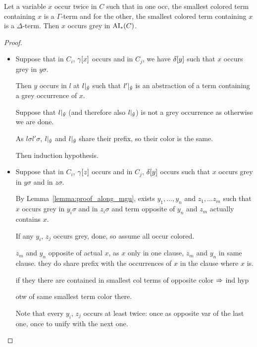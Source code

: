 \documentclass[,%
	paper=a4,%
	DIV11, %
	twoside=false,%
	liststotoc,
	bibtotoc,
	draft=false,%
	numbers=noendperiod
]{scrartcl}
\begin{document}
\begin{clemma}
	\label{lemma:smallest_colored_container}
	Let a variable $x$ occur twice in $C$ such that in one occ, the smallest colored term containing $x$ is a $\Gamma$-term and for the other, the smallest colored term containing $x$ is a $\Delta$-term.
	Then $x$ occurs grey in $\operatorname{AI}_\mathrm{*}(C)$.
\end{clemma}
\begin{proof}
	~
	\begin{itemize}
		\item
			Suppose that in $C_i$, $\gamma[x]$ occurs and in $C_j$, we have $\delta[y]$ such that $x$ occurs grey in $y\sigma$.

			Then $y$ occurs in $l$ at $l|_{\bm\hat y}$ such that $l'|_{\bm\hat y}$ is an abstraction of a term containing a grey occurrence of $x$.

			Suppose that $l|_{\bm\hat y}$ (and therefore also $l|_{\bm\hat y}$) is not a grey occurrence as otherwise we are done. 

			As $l\sigma l'\sigma $, $l|_{\bm\hat y}$ and $l|_{\bm\hat y}$ share their prefix, so their color is the same.

			Then induction hypothesis.

		\item 
			Suppose that in $C_i$, $\gamma[z]$ occurs and in $C_j$, $\delta[y]$ occurs such that $x$ occurs grey in $y\sigma$ and in $z\sigma$.

			By Lemma~\ref{lemma:proof_along_mgu}, exists $y_1, \dots, y_n$ and $z_1, \dots z_m$ such that $x$ occurs grey in $y_i\sigma$ and in $z_i\sigma$ and term opposite of $y_n$ and $z_m$ actually contains $x$.


			If any $y_i$, $z_j$ occurs grey, done, so assume all occur colored.

			$z_m$ and $y_n$ opposite of actual $x$, as $x$ only in one clause, $z_m$ and $y_n$ in same clause. 
			they do share prefix with the occurrences of $x$ in the clause where $x$ is.

			if they there are contained in smallest col terms of opposite color $\Rightarrow$ ind hyp

			otw of same smallest term color there.

			Note that every $y_i$, $z_j$ occurs at least twice: once as opposite var of the last one, once to unify with the next one.


\end{itemize}
\end{proof}
\end{document}
